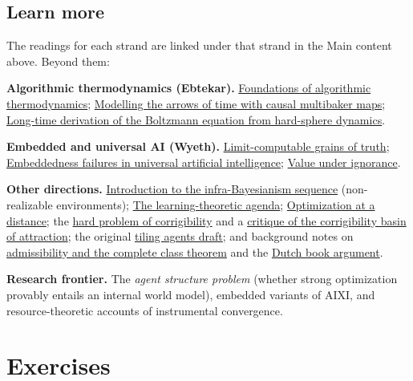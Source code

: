 \documentclass[11pt]{article}
\begin{document}
\subsection{Learn more}
The readings for each strand are linked under that strand in the Main content above. Beyond them:

\textbf{Algorithmic thermodynamics (Ebtekar).} \href{https://arxiv.org/abs/2308.06927}{Foundations of algorithmic thermodynamics}; \href{https://www.mdpi.com/1099-4300/26/9/776}{Modelling the arrows of time with causal multibaker maps}; \href{https://arxiv.org/abs/2408.07818}{Long-time derivation of the Boltzmann equation from hard-sphere dynamics}.

\textbf{Embedded and universal AI (Wyeth).} \href{https://arxiv.org/pdf/2508.16245}{Limit-computable grains of truth}; \href{https://arxiv.org/pdf/2505.17882}{Embeddedness failures in universal artificial intelligence}; \href{https://arxiv.org/pdf/2512.17086}{Value under ignorance}.

\textbf{Other directions.} \href{https://www.lesswrong.com/posts/zB4f7QqKhBHa5b37a/introduction-to-the-infra-bayesianism-sequence}{Introduction to the infra-Bayesianism sequence} (non-realizable environments); \href{https://www.lesswrong.com/posts/ZwshvqiqCvXPsZEct/the-learning-theoretic-agenda-status-2023}{The learning-theoretic agenda}; \href{https://www.lesswrong.com/posts/d2n74bwham8motxyX/optimization-at-a-distance}{Optimization at a distance}; the \href{https://www.lesswrong.com/w/hard-problem-of-corrigibility}{hard problem of corrigibility} and a \href{https://www.lesswrong.com/posts/oLbpfPkdtcknABvvw/the-corrigibility-basin-of-attraction-is-a-misleading-gloss}{critique of the corrigibility basin of attraction}; the original \href{https://intelligence.org/files/TilingAgentsDraft.pdf}{tiling agents draft}; and background notes on \href{https://www2.stat.duke.edu/~pdh10/Teaching/581/LectureNotes/admiss.pdf}{admissibility and the complete class theorem} and the \href{https://www.stat.berkeley.edu/~census/dutchdef.pdf}{Dutch book argument}.

\textbf{Research frontier.} The \emph{agent structure problem} (whether strong optimization provably entails an internal world model), embedded variants of AIXI, and resource-theoretic accounts of instrumental convergence.

\section{Exercises}
\label{sec:exercises}
\end{document}
